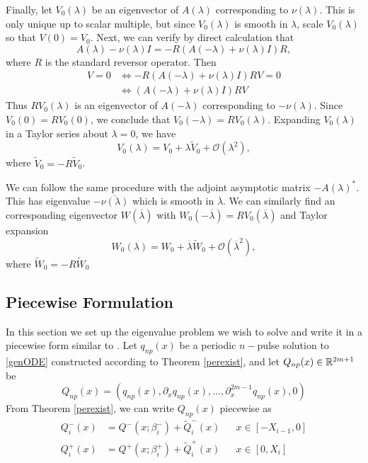 \documentclass[thesis.tex]{subfiles}
\begin{document}
Finally, let $V_0(\lambda)$ be an eigenvector of $A(\lambda)$ corresponding to $\nu(\lambda)$. This is only unique up to scalar multiple, but since $V_0(\lambda)$ is smooth in $\lambda$, scale $V_0(\lambda)$ so that $V(0) = V_0$. Next, we can verify by direct calculation that 
\[
A(\lambda) - \nu(\lambda) I = -R(A(-\lambda) + \nu(\lambda) I)R,
\]
where $R$ is the standard reversor operator. Then
\begin{align*}
[A(\lambda) - \nu(\lambda) I]V = 0 &\iff
-R(A(-\lambda) + \nu(\lambda) I)RV = 0 \\
&\iff (A(-\lambda) + \nu(\lambda) I)RV
\end{align*}
Thus $RV_0(\lambda)$ is an eigenvector of $A(-\lambda)$ corresponding to $-\nu(\lambda)$. Since $V_0(0) = RV_0(0)$, we conclude that $V_0(-\lambda) = R V_0(\lambda)$. Expanding $V_0(\lambda)$ in a Taylor series about $\lambda = 0$, we have
\[
V_0(\lambda) = V_0 + \lambda \tilde{V}_0 + \mathcal{O}(\lambda^2),
\]
where $\tilde{V}_0 = -R \tilde{V}_0$.

We can follow the same procedure with the adjoint asymptotic matrix $-A(\lambda)^*$. This has eigenvalue $-\overline{\nu(\lambda)}$ which is smooth in $\overline{\lambda}$. We can similarly find an corresponding eigenvector $W(\overline{\lambda})$ with $W_0(-\overline{\lambda}) = R V_0(\overline{\lambda})$ and Taylor expansion
\[
W_0(\lambda) = W_0 + \overline{\lambda} \tilde{W}_0 + \mathcal{O}(\overline{\lambda}^2),
\]
where $\tilde{W}_0 = -R \tilde{W}_0$

\subsection{Piecewise Formulation}

In this section we set up the eigenvalue problem we wish to solve and write it in a piecewise form similar to \cite{Sandstede1998}. Let $q_{np}(x)$ be a periodic $n-$pulse solution to \eqref{genODE} constructed according to Theorem \ref{perexist}, and let $Q_{np}(x) \in \mathbb{R}^{2m+1}$ be
\[
Q_{np}(x) = ( q_{np}(x), \partial_x q_{np}(x), \dots, \partial_x^{2m-1} q_{np}(x), 0 )
\]
From Theorem \ref{perexist}, we can write $Q_{np}(x)$ piecewise as
\begin{equation}\label{Qnppiece}
\begin{aligned}
Q_i^-(x) &= Q^-(x; \beta_i^-) + \tilde{Q}_i^-(x) && x \in [-X_{i-1}, 0] \\
Q_i^+(x) &= Q^+(x; \beta_i^+) + \tilde{Q}_i^+(x) && x \in [0, X_i]
\end{aligned}
\end{equation}
\end{document}
